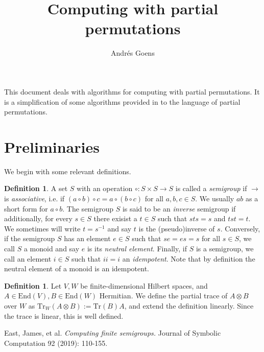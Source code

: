 \documentclass[12pt,a4paper,BCOR15mm,twoside,DIV12]{article}
\title{Computing with partial permutations}
\author{Andr\'{e}s Goens}
\def\End{\text{End}}
\def\Tr{\text{Tr}}
\theoremstyle{definition}
\newtheorem{defn}[Satz]{Definition}
\begin{document}
\maketitle
This document deals with algorithms for computing with partial permutations. It is a simplification of some algorithms provided in \cite{computing_finite_semigroups} to the language of partial permutations.
\section{Preliminaries}
We begin with some relevant definitions.


\begin{defn}\label{basics}
A set $S$ with an operation $\circ : S \times S \rightarrow S$ is called a \emph{semigroup} if $\rightarrow$ is \emph{associative}, i.e. if $(a \circ b) \circ c = a \circ (b \circ c)$ for all $a,b,c \in S$.
We usually $ab$ as a short form for $a \circ b$.
The semigroup $S$ is said to be an \emph{inverse} semigroup if additionally, for every $s \in S$ there exisist a $t \in S$ such that $sts = s$ and $tst = t$. We sometimes will write $t = s^{-1}$ and say $t$ is the (pseudo)inverse of $s$.
Conversely, if the semigroup $S$ has an element $e \in S$ such that $se = es = s$ for all $s \in S$, we call $S$ a monoid and say $e$ is its \emph{neutral element}.
Finally, if $S$ is a semigroup, we call an element $i \in S$ such that $ii = i$ an \emph{idempotent}. Note that by definition the neutral element of a monoid is an idempotent.
\end{defn}


\begin{defn}\label{partial-permutations}
Let $V, W$ be finite-dimensional Hilbert spaces, and $A \in \text{End}(V), B \in \End(W)$ Hermitian. We define the partial trace of $A \otimes B$ over $W$ as $\Tr_W(A \otimes B) := \Tr(B) A$, and extend the definition linearly. Since the trace is linear, this is well defined.
\end{defn}

\begin{thebibliography}{9}
   East, James, et al. \emph{Computing finite semigroups.} Journal of Symbolic Computation 92 (2019): 110-155.
    \end{thebibliography}
\end{document}
